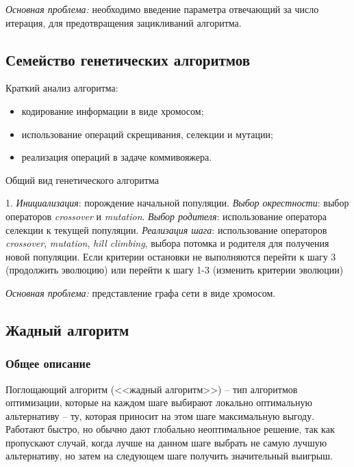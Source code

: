 \emph{Основная проблема:} необходимо введение параметра отвечающий за число итерация, для предотвращения 
зацикливаний алгоритма.

\subsection{Семейство генетических алгоритмов}
Краткий анализ алгоритма:
\begin{itemize}
    \item кодирование информации в виде хромосом;
    \item использование операций скрещивания, селекции и мутации;
    \item реализация операций в задаче коммивояжера.
\end{itemize}


\begin{algorithm}[ht!]
    \caption{Общий вид генетического алгоритма}
    1. \emph{Инициализация}: порождение начальной популяции. \emph{Выбор окрестности}: выбор операторов \emph{crossover} и \emph{mutation}. \emph{Выбор родителя}: использование оператора селекции к текущей популяции. \emph{Реализация шага}: использование операторов \emph{crossover}, 
        \emph{mutation}, \emph{hill climbing}, выбора потомка и родителя для получения 
        новой популяции. Если критерии остановки не выполняются перейти к шагу 3 (продолжить эволюцию) 
        или перейти к шагу 1-3 (изменить критерии эволюции)\;
    \label{alg:genetic}
\end{algorithm}

\emph{Основная проблема:} представление графа сети в виде хромосом.

\newpage

\subsection{Жадный алгоритм}
\label{sec:greedy-alg}
\subsubsection{Общее описание}
Поглощающий алгоритм (<<жадный алгоритм>>) -- тип алгоритмов оптимизации, которые на каждом шаге выбирают 
локально оптимальную альтернативу -- ту, которая приносит на этом шаге максимальную выгоду. Работают быстро, 
но обычно дают глобально неоптимальное решение, так как пропускают случай, когда лучше на данном шаге 
выбрать не самую лучшую альтернативу, но затем на следующем шаге получить значительный выигрыш.

